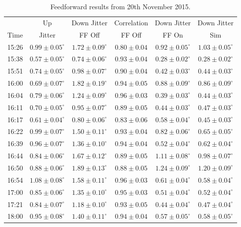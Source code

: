 \begin{table}
  \begin{center}
    \begin{tabular}{ c  c  c  c  c  c  }
	   \hline
	           & Up  & Down Jitter & Correlation  & Down Jitter  & Down Jitter \\
       Time & Jitter &  FF Off &  FF Off &  FF On &  Sim \\ \hline
15:26 & \(0.99\pm0.05^\circ\) & \(1.72\pm0.09^\circ\) & \(0.80\pm0.04\) & \(0.92\pm0.05^\circ\) & \(1.03\pm0.05^\circ\) \\
15:38 & \(0.57\pm0.05^\circ\) & \(0.74\pm0.06^\circ\) & \(0.93\pm0.04\) & \(0.28\pm0.02^\circ\) & \(0.28\pm0.02^\circ\) \\
15:51 & \(0.74\pm0.05^\circ\) & \(0.98\pm0.07^\circ\) & \(0.90\pm0.04\) & \(0.42\pm0.03^\circ\) & \(0.44\pm0.03^\circ\) \\
16:00 & \(0.69\pm0.07^\circ\) & \(1.82\pm0.19^\circ\) & \(0.94\pm0.05\) & \(0.88\pm0.09^\circ\) & \(0.86\pm0.09^\circ\) \\
16:04 & \(0.79\pm0.06^\circ\) & \(1.24\pm0.09^\circ\) & \(0.96\pm0.03\) & \(0.39\pm0.03^\circ\) & \(0.44\pm0.03^\circ\) \\
16:11 & \(0.70\pm0.05^\circ\) & \(0.95\pm0.07^\circ\) & \(0.89\pm0.05\) & \(0.44\pm0.03^\circ\) & \(0.47\pm0.03^\circ\) \\
16:17 & \(0.61\pm0.04^\circ\) & \(0.80\pm0.06^\circ\) & \(0.83\pm0.06\) & \(0.58\pm0.04^\circ\) & \(0.45\pm0.03^\circ\) \\
16:22 & \(0.99\pm0.07^\circ\) & \(1.50\pm0.11^\circ\) & \(0.93\pm0.04\) & \(0.82\pm0.06^\circ\) & \(0.65\pm0.05^\circ\) \\
16:39 & \(0.96\pm0.07^\circ\) & \(1.36\pm0.10^\circ\) & \(0.94\pm0.04\) & \(0.52\pm0.04^\circ\) & \(0.62\pm0.04^\circ\) \\
16:44 & \(0.84\pm0.06^\circ\) & \(1.67\pm0.12^\circ\) & \(0.89\pm0.05\) & \(1.11\pm0.08^\circ\) & \(0.98\pm0.07^\circ\) \\
16:50 & \(0.88\pm0.06^\circ\) & \(1.89\pm0.13^\circ\) & \(0.88\pm0.05\) & \(1.24\pm0.09^\circ\) & \(1.20\pm0.09^\circ\) \\
16:54 & \(1.08\pm0.08^\circ\) & \(1.58\pm0.11^\circ\) & \(0.96\pm0.03\) & \(0.61\pm0.04^\circ\) & \(0.58\pm0.04^\circ\) \\
17:00 & \(0.85\pm0.06^\circ\) & \(1.35\pm0.10^\circ\) & \(0.95\pm0.03\) & \(0.51\pm0.04^\circ\) & \(0.52\pm0.04^\circ\) \\
17:21 & \(0.84\pm0.07^\circ\) & \(1.18\pm0.10^\circ\) & \(0.93\pm0.05\) & \(0.44\pm0.04^\circ\) & \(0.47\pm0.04^\circ\) \\
18:00 & \(0.95\pm0.08^\circ\) & \(1.40\pm0.11^\circ\) & \(0.94\pm0.04\) & \(0.57\pm0.05^\circ\) & \(0.58\pm0.05^\circ\) \\
    \end{tabular}
    \caption{Feedforward results from 20th November 2015.}
  	\label{t:LongFFIndiv}
  \end{center}
\end{table}



